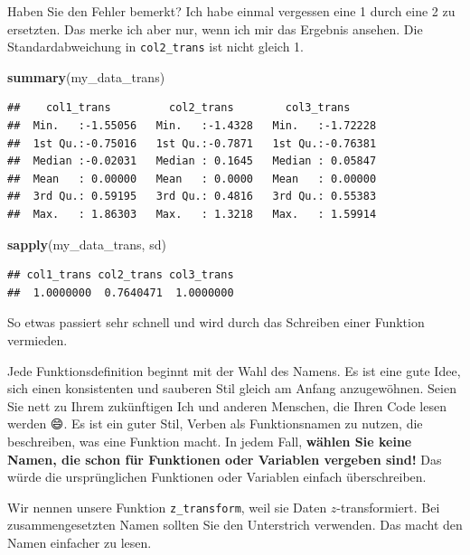 \documentclass[]{book}
\newenvironment{Shaded}{\begin{snugshade}}{\end{snugshade}}
\newcommand{\KeywordTok}[1]{\textcolor[rgb]{0.13,0.29,0.53}{\textbf{#1}}}
\newcommand{\NormalTok}[1]{#1}
\begin{document}
Haben Sie den Fehler bemerkt? Ich habe einmal vergessen eine 1 durch eine 2 zu ersetzten. Das merke ich aber nur, wenn ich mir das Ergebnis ansehen. Die Standardabweichung in \texttt{col2\_trans} ist nicht gleich 1.

\begin{Shaded}
\begin{Highlighting}[]
\KeywordTok{summary}\NormalTok{(my_data_trans)}
\end{Highlighting}
\end{Shaded}

\begin{verbatim}
##    col1_trans         col2_trans        col3_trans      
##  Min.   :-1.55056   Min.   :-1.4328   Min.   :-1.72228  
##  1st Qu.:-0.75016   1st Qu.:-0.7871   1st Qu.:-0.76381  
##  Median :-0.02031   Median : 0.1645   Median : 0.05847  
##  Mean   : 0.00000   Mean   : 0.0000   Mean   : 0.00000  
##  3rd Qu.: 0.59195   3rd Qu.: 0.4816   3rd Qu.: 0.55383  
##  Max.   : 1.86303   Max.   : 1.3218   Max.   : 1.59914
\end{verbatim}

\begin{Shaded}
\begin{Highlighting}[]
\KeywordTok{sapply}\NormalTok{(my_data_trans, sd)}
\end{Highlighting}
\end{Shaded}

\begin{verbatim}
## col1_trans col2_trans col3_trans 
##  1.0000000  0.7640471  1.0000000
\end{verbatim}

So etwas passiert sehr schnell und wird durch das Schreiben einer Funktion vermieden.

Jede Funktionsdefinition beginnt mit der Wahl des Namens. Es ist eine gute Idee, sich einen konsistenten und sauberen Stil gleich am Anfang anzugewöhnen. Seien Sie nett zu Ihrem zukünftigen Ich und anderen Menschen, die Ihren Code lesen werden 😄. Es ist ein guter Stil, Verben als Funktionsnamen zu nutzen, die beschreiben, was eine Funktion macht. In jedem Fall, \textbf{wählen Sie keine Namen, die schon für Funktionen oder Variablen vergeben sind!} Das würde die ursprünglichen Funktionen oder Variablen einfach überschreiben.

Wir nennen unsere Funktion \texttt{z\_transform}, weil sie Daten \(z\)-transformiert. Bei zusammengesetzten Namen sollten Sie den Unterstrich verwenden. Das macht den Namen einfacher zu lesen.
\end{document}
